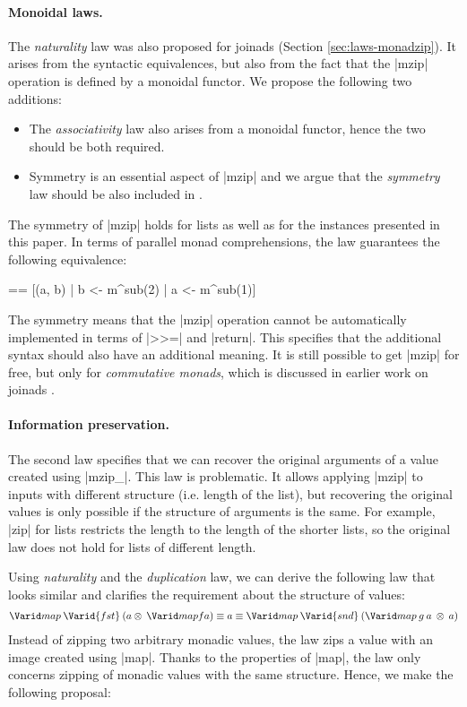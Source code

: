 \documentclass{sigplanconf}
\begin{document}
\paragraph{Monoidal laws.}
The \textit{naturality} law was also proposed for joinads (Section \ref{sec:laws-monadzip}). It
arises from the syntactic equivalences, but also from the fact that the |mzip| operation is defined by a 
monoidal functor. We propose the following two additions:

\begin{itemize}
\item The \textit{associativity} law also arises from a monoidal functor,
  hence the two should be both required.
  
\item Symmetry is an essential aspect of |mzip| and we argue that 
  the \textit{symmetry} law should be also included in .

\end{itemize}
The symmetry of |mzip| holds for lists as well as for the  instances presented in 
this paper. In terms of parallel monad comprehensions, the law guarantees the following 
equivalence:
\begin{code}
 == [(a, b) | b <- m^sub(2) | a <- m^sub(1)]
\end{code}
The symmetry means that the |mzip| operation cannot be automatically implemented in 
terms of |>>=| and |return|. This specifies that the additional syntax
should also have an additional meaning. It is still possible to get |mzip| for free, 
but only for \textit{commutative monads}, which is discussed in earlier work on 
joinads \cite{joinads}.

\paragraph{Information preservation.}
The second law specifies that we can recover the original arguments of a value created using 
|mzip_|. This law is problematic. It allows applying |mzip| to inputs with different structure 
(i.e. length of the list), but recovering the original values is only possible if 
the structure of arguments is the same. For example, |zip| for lists restricts the length to the
length of the shorter lists, so the original law does not hold for lists of different length.

Using \textit{naturality} and the \textit{duplication} law, we can derive the
following law that looks similar and clarifies the requirement about the structure of values:
\begin{align*}
  \map \: \Varid{fst} \: (a \mzip \: \map f a) \equiv a \equiv \map \: \Varid{snd} \: (\map \: g \: a \: \mzip \: a)
\end{align*}
Instead of zipping two arbitrary monadic values, the law zips a value with an image created using 
|map|. Thanks to the properties of |map|, the law only concerns zipping of monadic values with the 
same structure. Hence, we make the following proposal:
\end{document}
